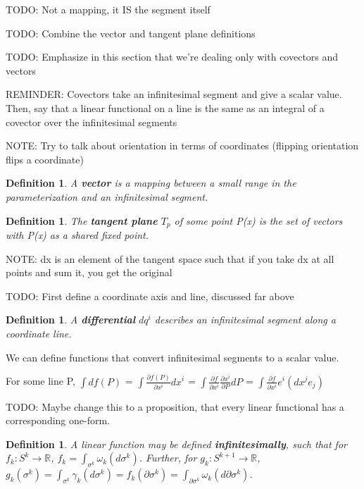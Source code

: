 \documentclass{book}
\newtheorem{defn}[equation]{Definition}
\begin{document}
TODO: Not a mapping, it IS the segment itself 

TODO: Combine the vector and tangent plane definitions

TODO: Emphasize in this section that we're dealing only with covectors and vectors 

REMINDER: Covectors take an infinitesimal segment and give a scalar value. Then, say that a linear functional on a line is the same as an integral of a covector over the infinitesimal segments 

NOTE: Try to talk about orientation in terms of coordinates (flipping orientation flips a coordinate)

\begin{defn}
	A \textbf{vector} is a mapping between a small range in the parameterization and an infinitesimal segment. 
\end{defn}

\begin{defn}
	The \textbf{tangent plane} $T_p$ of some point P(x) is the set of vectors with P(x) as a shared fixed point. 
\end{defn}



NOTE: dx is an element of the tangent space such that if you take dx at all points and sum it, you get the original

TODO: First define a coordinate axis and line, discussed far above
\begin{defn}
	A \textbf{differential} $dq^i$ describes an infinitesimal segment along a coordinate line. 
\end{defn}

We can define functions that convert infinitesimal segments to a scalar value. 

For some line P, $\int df(P)$ = $\int \frac{\partial f(P)}{{\partial x^i}} dx^i$ = $\int \frac{\partial f}{\partial x^i}\frac{\partial x^i}{\partial P}dP$ = $\int \frac{{\partial f}}{{\partial x^i}} e^i (dx^j e_j)$



TODO: Maybe change this to a proposition, that every linear functional has a corresponding one-form. 
\begin{defn}
	A linear function may be defined \textbf{infinitesimally}, such that for $f_k : S^k \to \mathbb{R}$, $f_k = \int_{\sigma^k} \omega_k(d\sigma^k)$. Further, for $g_k : S^{k+1} \to \mathbb{R}$, $g_k(\sigma^k) = \int_{\sigma^k} \gamma_k(d\sigma^k) = f_k(\partial\sigma^k) = \int_{\partial\sigma^k}\omega_k(d\partial\sigma^k)$. 
\end{defn}
\end{document}
